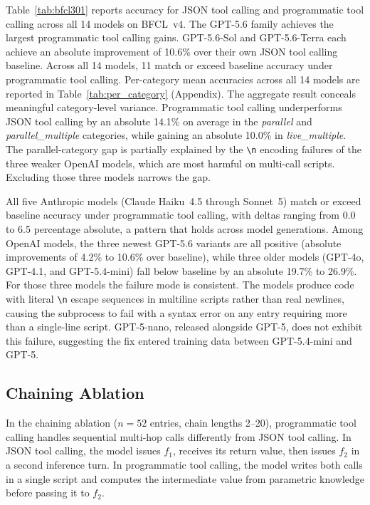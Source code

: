 \documentclass[11pt]{article}
\newcommand{\bfcl}{BFCL~v4}
\newcommand{\codemode}{programmatic tool calling}
\newcommand{\Codemode}{Programmatic tool calling}
\newcommand{\nmodels}{14}
\begin{document}
Table~\ref{tab:bfcl301} reports accuracy for JSON tool calling and \codemode{} across all
\nmodels{} models on \bfcl{}.
The GPT-5.6 family achieves the largest \codemode{} gains. GPT-5.6-Sol and
GPT-5.6-Terra each achieve an absolute improvement of 10.6\% over their own JSON tool calling baseline.
Across all \nmodels{} models, 11 match or exceed baseline accuracy under \codemode{}.
Per-category mean accuracies across all 14 models are reported in
Table~\ref{tab:per_category} (Appendix). The aggregate result conceals meaningful
category-level variance.
\Codemode{} underperforms JSON tool calling by an absolute 14.1\% on average in the
\textit{parallel} and \textit{parallel\_multiple} categories, while gaining an absolute 10.0\% in \textit{live\_multiple}.
The parallel-category gap is partially explained by the \texttt{\textbackslash n}
encoding failures of the three weaker OpenAI models, which are most harmful on
multi-call scripts. Excluding those three models narrows the gap.

All five Anthropic models (Claude Haiku~4.5 through Sonnet~5) match or exceed
baseline accuracy under \codemode{}, with deltas ranging from 0.0 to 6.5 percentage
absolute, a pattern that holds across model generations.
Among OpenAI models, the three newest GPT-5.6 variants are all positive (absolute improvements of 4.2\% to 10.6\% over baseline), while three older models (GPT-4o, GPT-4.1, and
GPT-5.4-mini) fall below baseline by an absolute 19.7\% to 26.9\%.
For those three models the failure mode is consistent. The models produce code
with literal \texttt{\textbackslash n} escape sequences in multiline scripts
rather than real newlines, causing the subprocess to fail with a syntax error on
any entry requiring more than a single-line script.
GPT-5-nano, released alongside GPT-5, does not exhibit this failure, suggesting
the fix entered training data between GPT-5.4-mini and GPT-5.

\subsection{Chaining Ablation}

In the chaining ablation ($n = 52$ entries, chain lengths 2--20), \codemode{}
handles sequential multi-hop calls differently from JSON tool calling.
In JSON tool calling, the model issues $f_1$, receives its return value, then issues $f_2$
in a second inference turn.
In \codemode{}, the model writes both calls in a single script and computes the
intermediate value from parametric knowledge before passing it to $f_2$.
\end{document}
